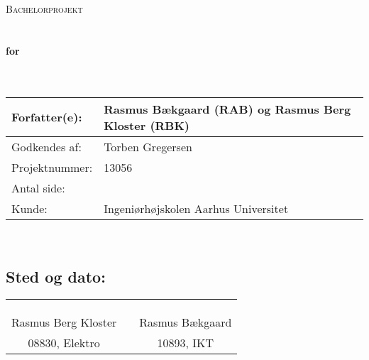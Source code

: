 \begin{center}



\textsc{\Large Bachelorprojekt}\\[0.5cm]


\HRule \\[0.4cm]

{ \huge \bfseries \DocumentType}\\[0.4cm]
{ \huge \bfseries for}\\[0.4cm] 
{ \huge \bfseries \ProjectName}\\[0.4cm]

\HRule \\[1.5cm]

\begin{tabular}{p{}|p{}}
\hline 
Forfatter(e): & Rasmus Bækgaard (RAB) og Rasmus Berg Kloster (RBK)\\ 
\hline 
Godkendes af: & Torben Gregersen \\ 
\hline
Projektnummer: & 13056\\
\hline
Antal side: & \pageref{LastPage} \\
\hline 
Kunde: & Ingeniørhøjskolen Aarhus Universitet \\
\hline
\end{tabular} 
%



\end{center}

\mbox{}\\

\subsection*{Sted og dato:}
\begin{tabular}{c p{} c}
&& \\
&& \\
\underline{\qquad \qquad \qquad \qquad \qquad \qquad \qquad} & \qquad & \underline{\qquad \qquad \qquad \qquad \qquad \qquad \qquad}  \\ 
Rasmus Berg Kloster & & Rasmus Bækgaard \\
08830, Elektro & & 10893, IKT
\end{tabular} 